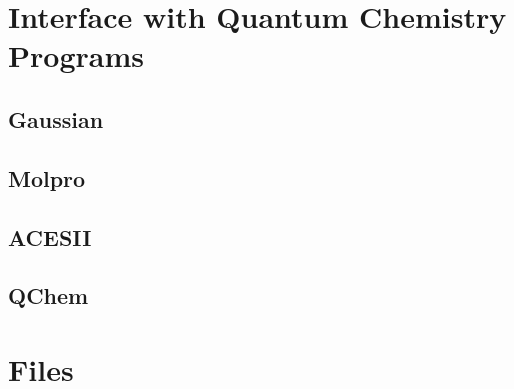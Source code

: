 \documentclass[a4paper,12pt]{article}
\begin{document}
\newpage

\section{Interface with Quantum Chemistry Programs} \label{interface}
\subsection{Gaussian}
\subsection{Molpro}
\subsection{ACESII}
\subsection{QChem}

\newpage
\section{Files}

\newpage


\end{document}
